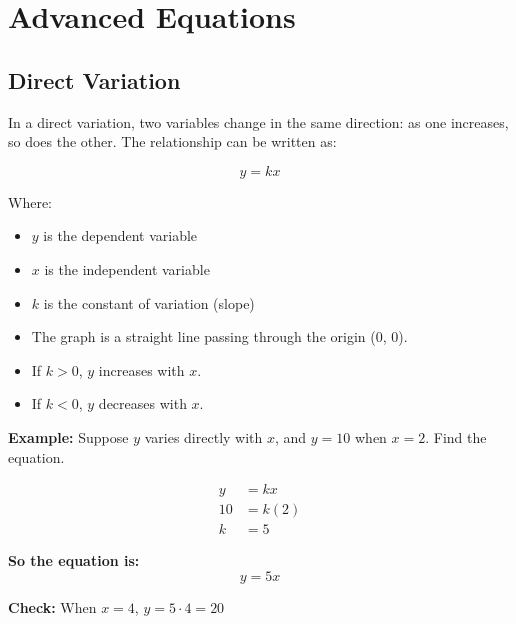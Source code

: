 \documentclass[11pt]{article}
\begin{document}
\section{Advanced Equations}

\subsection{Direct Variation}

In a direct variation, two variables change in the same direction: as one increases, so does the other. The relationship can be written as:

\[
y = kx
\]

Where:
\begin{itemize}
  \item \( y \) is the dependent variable
  \item \( x \) is the independent variable
  \item \( k \) is the constant of variation (slope)
\end{itemize}

\begin{tcolorbox}[colback=green!5!white, colframe=green!60!black, title=Key Characteristics]
\begin{itemize}
  \item The graph is a straight line passing through the origin (0, 0).
  \item If \( k > 0 \), \( y \) increases with \( x \).
  \item If \( k < 0 \), \( y \) decreases with \( x \).
\end{itemize}
\end{tcolorbox}

\textbf{Example:} Suppose \( y \) varies directly with \( x \), and \( y = 10 \) when \( x = 2 \). Find the equation.

\begin{align*}
y &= kx \\
10 &= k(2) \\
k &= 5
\end{align*}

\textbf{So the equation is:}
\[
y = 5x
\]

\textbf{Check:} When \( x = 4 \), \( y = 5 \cdot 4 = 20 \)

\begin{center}
\end{center}
\end{document}
